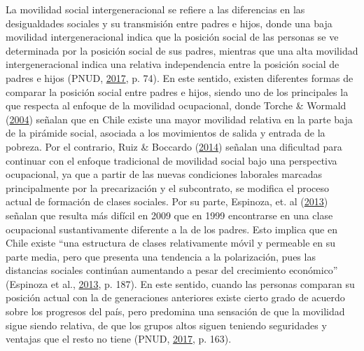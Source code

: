\documentclass[
]{article}
\begin{document}
La movilidad social intergeneracional se refiere a las diferencias en
las desigualdades sociales y su transmisión entre padres e hijos, donde
una baja movilidad intergeneracional indica que la posición social de
las personas se ve determinada por la posición social de sus padres,
mientras que una alta movilidad intergeneracional indica una relativa
independencia entre la posición social de padres e hijos (PNUD,
\protect\hyperlink{ref-pnud_Desiguales_2017}{2017}, p. 74). En este
sentido, existen diferentes formas de comparar la posición social entre
padres e hijos, siendo uno de los principales la que respecta al enfoque
de la movilidad ocupacional, donde Torche \& Wormald
(\protect\hyperlink{ref-torche_Estratificacion_2004}{2004}) señalan que
en Chile existe una mayor movilidad relativa en la parte baja de la
pirámide social, asociada a los movimientos de salida y entrada de la
pobreza. Por el contrario, Ruiz \& Boccardo
(\protect\hyperlink{ref-ruiz_chilenos_2014}{2014}) señalan una
dificultad para continuar con el enfoque tradicional de movilidad social
bajo una perspectiva ocupacional, ya que a partir de las nuevas
condiciones laborales marcadas principalmente por la precarización y el
subcontrato, se modifica el proceso actual de formación de clases
sociales. Por su parte, Espinoza, et. al
(\protect\hyperlink{ref-espinoza_Estratificacion_2013}{2013}) señalan
que resulta más difícil en 2009 que en 1999 encontrarse en una clase
ocupacional sustantivamente diferente a la de los padres. Esto implica
que en Chile existe ``una estructura de clases relativamente móvil y
permeable en su parte media, pero que presenta una tendencia a la
polarización, pues las distancias sociales continúan aumentando a pesar
del crecimiento económico'' (Espinoza et al.,
\protect\hyperlink{ref-espinoza_Estratificacion_2013}{2013}, p. 187). En
este sentido, cuando las personas comparan su posición actual con la de
generaciones anteriores existe cierto grado de acuerdo sobre los
progresos del país, pero predomina una sensación de que la movilidad
sigue siendo relativa, de que los grupos altos siguen teniendo
seguridades y ventajas que el resto no tiene (PNUD,
\protect\hyperlink{ref-pnud_Desiguales_2017}{2017}, p. 163).
\end{document}
